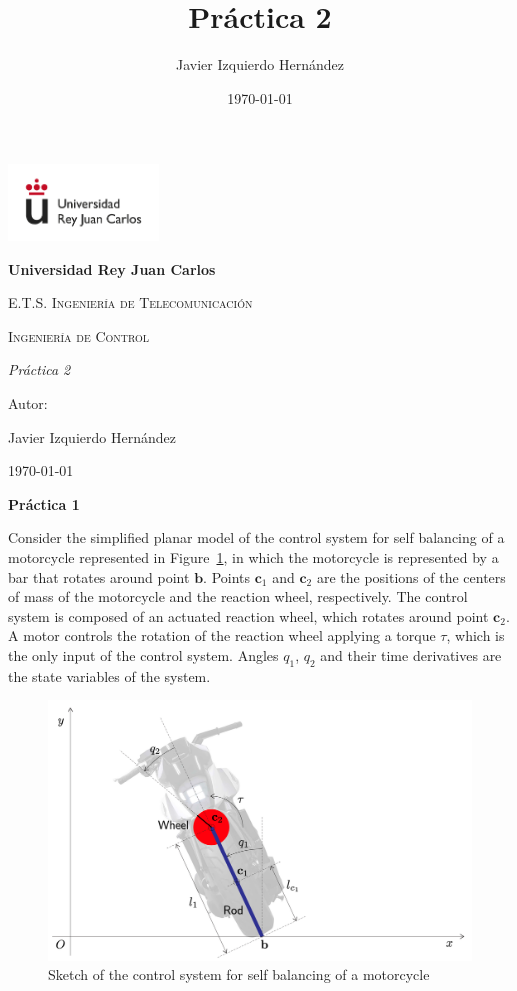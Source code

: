 \documentclass{article}
\title{Práctica 2}
\author{Javier Izquierdo Hernández}
\date{\today}
\begin{document}
	\begin{titlepage}
		\centering
		{\includegraphics[width=0.3\textwidth]{figures/logo}\par}
		\vspace{1cm}
		{\bfseries\LARGE Universidad Rey Juan Carlos \par}
		\vspace{1cm}
		{\scshape\Large E.T.S. Ingeniería de Telecomunicación \par}
		\vspace{3cm}
		{\scshape\Huge Ingeniería de Control \par}
		\vspace{3cm}
		{\itshape\Large Práctica 2 \par}
		\vfill
		{\Large Autor: \par}
		{\Large Javier Izquierdo Hernández \par}
		\vfill
		{\Large \today \par}
	\end{titlepage}
	\begin{center}
		{\huge \bf Práctica 1}
	\end{center}


Consider the simplified planar model of the control system for self balancing of a motorcycle represented in Figure~\ref{fig:figure_1}, in which the motorcycle is represented by a bar that rotates around point $\mathbf{b}$. 
Points $\mathbf{c}_1$ and  $\mathbf{c}_2$ are the positions of the centers of mass of the motorcycle and the reaction wheel, respectively. 
The control system is composed of an actuated reaction wheel, which rotates around point $\mathbf{c}_2$. A motor controls the rotation of the reaction wheel applying a torque $\tau$, which is the only input of the control system. Angles $q_1$, $q_2$ and their time derivatives are the state variables of the system.  





\begin{figure}[h]
\includegraphics[width=1\linewidth]{figures/drawing}
\caption{Sketch of the control system for self balancing of a motorcycle}
\label{fig:figure_1}
\end{figure}
\end{document}
